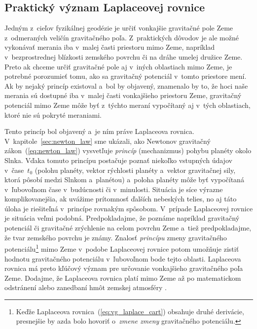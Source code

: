 \documentclass[a4paper, 12pt]{book}
\begin{document}
\subsection{Praktický význam Laplaceovej rovnice}
\label{sec:meaning_of_laplace_equation_in_practice}

Jedným z~cieľov fyzikálnej geodézie je určiť vonkajšie gravitačné pole Zeme 
z~odmeraných veličín gravitačného poľa.  Z~praktických dôvodov je ale možné 
vykonávať merania iba v~malej časti priestoru mimo Zeme, napríklad 
v~bezprostrednej blízkosti zemského povrchu či na dráhe umelej družice Zeme.  
Preto ak chceme určiť gravitačné pole aj v~iných oblastiach mimo Zeme, je 
potrebné porozumieť tomu, ako sa gravitačný potenciál v~tomto priestore mení.  
Ak by nejaký princíp existoval a~bol by objavený, znamenalo by to, že hoci naše 
merania sú dostupné iba v~malej časti vonkajšieho priestoru Zeme, gravitačný 
potenciál mimo Zeme môže byť z~týchto meraní vypočítaný aj v~tých oblastiach, 
ktoré nie sú pokryté meraniami.

Tento princíp bol objavený a~je ním práve Laplaceova rovnica.  
V~kapitole~\ref{sec:newton_law} sme ukázali, ako Newtonov gravitačný 
zákon~(\ref{eq:newton_law}) vysvetľuje \emph{princíp} (mechanizmus) pohybu 
planéty okolo Slnka.  Vďaka tomuto princípu postačuje poznať niekoľko vstupných 
údajov v~čase~$t_0$ (polohu planéty, vektor rýchlosti planéty a~vektor 
gravitačnej sily, ktorá pôsobí medzi Slnkom a~planétou) a~poloha planéty môže 
byť vypočítaná v~ľubovoľnom čase v~budúcnosti či v~minulosti.  Situácia je síce 
výrazne komplikovanejšia, ak uvážime prítomnosť ďalších nebeských telies, no aj 
táto úloha je riešiteľná v~princípe rovnakým spôsobom.  V~prípade Laplaceovej 
rovnice je situácia veľmi podobná.  Predpokladajme, že poznáme napríklad 
gravitačný potenciál či gravitačné zrýchlenie na celom povrchu Zeme a~tiež 
predpokladajme, že tvar zemského povrchu je známy.  Znalosť \emph{princípu} 
zmeny gravitačného potenciálu\footnote{Keďže Laplaceova 
rovnica~(\ref{eq:vg_laplace_cart}) obsahuje druhé derivácie, presnejšie by azda 
bolo hovoriť o~\textit{zmene zmeny} gravitačného potenciálu.} mimo Zeme 
v~podobe Laplaceovej rovnice potom umožňuje zistiť hodnotu gravitačného 
potenciálu v~ľubovoľnom bode tejto oblasti.  Laplaceova rovnica má preto 
kľúčový význam pre určovanie vonkajšieho gravitačného poľa Zeme.  Dodajme, že 
Laplaceova rovnica platí mimo Zeme až po matematickom odstránení alebo 
zanedbaní hmôt zemskej atmosféry \parencite[pozri napríklad][]{Janak2006}.
\end{document}
